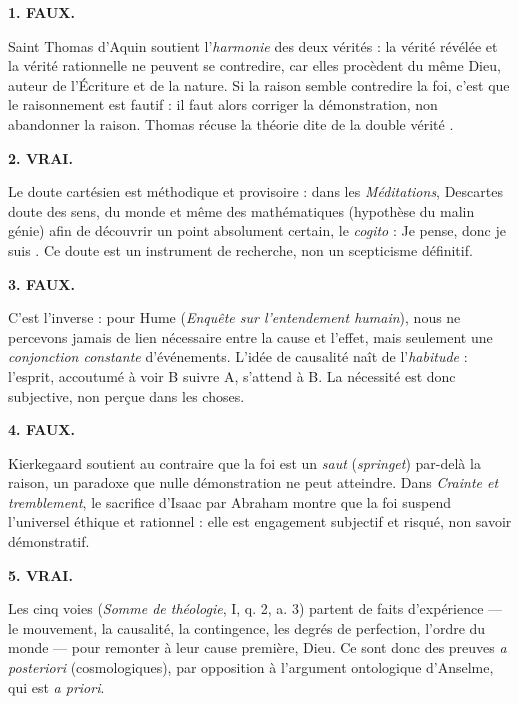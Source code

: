\documentclass[11pt]{article}
\begin{document}
\begin{corrige}

\textbf{1. FAUX.}\par Saint Thomas d'Aquin soutient l'\emph{harmonie} des deux vérités : la vérité révélée et la vérité rationnelle ne peuvent se contredire, car elles procèdent du même Dieu, auteur de l'Écriture et de la nature. Si la raison semble contredire la foi, c'est que le raisonnement est fautif : il faut alors corriger la démonstration, non abandonner la raison. Thomas récuse la théorie dite de la \guillemotleft double vérité \guillemotright.

\textbf{2. VRAI.}\par Le doute cartésien est méthodique et provisoire : dans les \emph{Méditations}, Descartes doute des sens, du monde et même des mathématiques (hypothèse du malin génie) afin de découvrir un point absolument certain, le \emph{cogito} : \guillemotleft Je pense, donc je suis \guillemotright. Ce doute est un instrument de recherche, non un scepticisme définitif.

\textbf{3. FAUX.}\par C'est l'inverse : pour Hume (\emph{Enquête sur l'entendement humain}), nous ne percevons jamais de lien nécessaire entre la cause et l'effet, mais seulement une \emph{conjonction constante} d'événements. L'idée de causalité naît de l'\emph{habitude} : l'esprit, accoutumé à voir B suivre A, s'attend à B. La nécessité est donc subjective, non perçue dans les choses.

\textbf{4. FAUX.}\par Kierkegaard soutient au contraire que la foi est un \emph{saut} (\emph{springet}) par-delà la raison, un paradoxe que nulle démonstration ne peut atteindre. Dans \emph{Crainte et tremblement}, le sacrifice d'Isaac par Abraham montre que la foi suspend l'universel éthique et rationnel : elle est engagement subjectif et risqué, non savoir démonstratif.

\textbf{5. VRAI.}\par Les \guillemotleft cinq voies \guillemotright (\emph{Somme de théologie}, I, q. 2, a. 3) partent de faits d'expérience — le mouvement, la causalité, la contingence, les degrés de perfection, l'ordre du monde — pour remonter à leur cause première, Dieu. Ce sont donc des preuves \emph{a posteriori} (cosmologiques), par opposition à l'argument ontologique d'Anselme, qui est \emph{a priori}.

\end{corrige}
\end{document}
